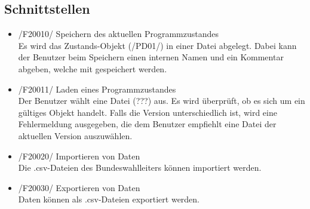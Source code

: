 \documentclass[10pt,a4paper]{article}
\begin{document}
\subsection{Schnittstellen}
\begin{itemize}
	\item /F20010/ Speichern des aktuellen Programmzustandes \hfill \\
	Es wird das Zustands-Objekt (/PD01/) in einer Datei abgelegt. Dabei kann der Benutzer beim Speichern einen internen Namen und ein Kommentar abgeben, welche mit gespeichert werden.
	\item /F20011/ Laden eines Programmzustandes \hfill \\
	Der Benutzer wählt eine Datei (???) aus. Es wird überprüft, ob es sich um ein gültiges Objekt handelt. Falls die Version unterschiedlich ist, wird eine Fehlermeldung ausgegeben, die dem Benutzer empfiehlt eine Datei der aktuellen Version auszuwählen.
	\item /F20020/ Importieren von Daten \hfill \\
	Die .csv-Dateien des Bundeswahlleiters können importiert werden.
	\item /F20030/ Exportieren von Daten \hfill \\
	Daten können als .csv-Dateien exportiert werden.
	

\end{itemize}
\end{document}

